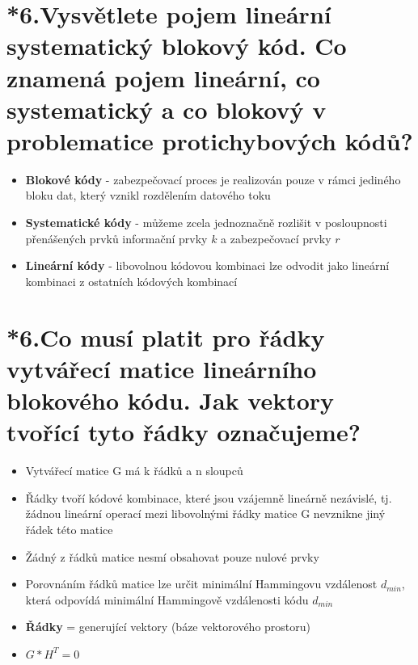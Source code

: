 \section{*6.Vysvětlete pojem lineární systematický blokový kód. Co znamená pojem lineární, co systematický a co blokový v problematice protichybových kódů?}
\begin{itemize}
    \item \textbf{Blokové kódy} - zabezpečovací proces je realizován pouze v rámci jediného bloku dat, který vznikl rozdělením datového toku
    \item \textbf{Systematické kódy} - můžeme zcela jednoznačně rozlišit v posloupnosti přenášených prvků informační prvky $k$ a zabezpečovací prvky $r$
    \item \textbf{Lineární kódy} - libovolnou kódovou kombinaci lze odvodit jako lineární kombinaci z ostatních kódových kombinací
\end{itemize}

\section{*6.Co musí platit pro řádky vytvářecí matice lineárního blokového kódu. Jak vektory tvořící tyto řádky označujeme?}
\begin{itemize}
    \item Vytvářecí matice G má k řádků a n sloupců
    \item Řádky tvoří kódové kombinace, které jsou vzájemně lineárně nezávislé, tj. žádnou lineární operací mezi libovolnými řádky matice G nevznikne jiný řádek této matice
    \item Žádný z řádků matice nesmí obsahovat pouze nulové prvky
    \item Porovnáním řádků matice lze určit minimální Hammingovu vzdálenost $d_{min}$, která odpovídá minimální Hammingově vzdálenosti kódu $d_{min}$
    \item \textbf{Řádky} = generující vektory (báze vektorového prostoru)
    \item $G*H^{T}=0$
\end{itemize}